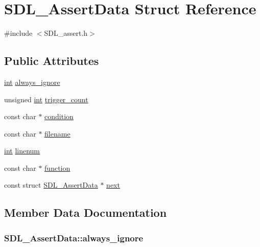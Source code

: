 \hypertarget{struct_s_d_l___assert_data}{}\section{S\+D\+L\+\_\+\+Assert\+Data Struct Reference}
\label{struct_s_d_l___assert_data}


{\ttfamily \#include $<$S\+D\+L\+\_\+assert.\+h$>$}

\subsection*{Public Attributes}
\begin{DoxyCompactItemize}
\item 
\hyperlink{_s_d_l__thread_8h_a6a64f9be4433e4de6e2f2f548cf3c08e}{int} \hyperlink{struct_s_d_l___assert_data_a825e1c7772fe24afad33d0afc42cf04c}{always\+\_\+ignore}
\item 
unsigned \hyperlink{_s_d_l__thread_8h_a6a64f9be4433e4de6e2f2f548cf3c08e}{int} \hyperlink{struct_s_d_l___assert_data_a230bbcc2d115aab04cf817773e08eb5b}{trigger\+\_\+count}
\item 
const char $\ast$ \hyperlink{struct_s_d_l___assert_data_aec6d372462fa8c94a9d04c1168cd38c9}{condition}
\item 
const char $\ast$ \hyperlink{struct_s_d_l___assert_data_acf27f593e6a436386d2cbcf826cf1ef7}{filename}
\item 
\hyperlink{_s_d_l__thread_8h_a6a64f9be4433e4de6e2f2f548cf3c08e}{int} \hyperlink{struct_s_d_l___assert_data_ad026d8573970d2402230d5fa3c550b0f}{linenum}
\item 
const char $\ast$ \hyperlink{struct_s_d_l___assert_data_a4913c57d4affb813feea82fc5f48a25c}{function}
\item 
const struct \hyperlink{struct_s_d_l___assert_data}{S\+D\+L\+\_\+\+Assert\+Data} $\ast$ \hyperlink{struct_s_d_l___assert_data_a2081dcf06dce4df497e423bccddfc099}{next}
\end{DoxyCompactItemize}


\subsection{Member Data Documentation}
\subsubsection[{\texorpdfstring{always\+\_\+ignore}{always_ignore}}]{ S\+D\+L\+\_\+\+Assert\+Data\+::always\+\_\+ignore}\hypertarget{struct_s_d_l___assert_data_a825e1c7772fe24afad33d0afc42cf04c}{}\label{struct_s_d_l___assert_data_a825e1c7772fe24afad33d0afc42cf04c}
